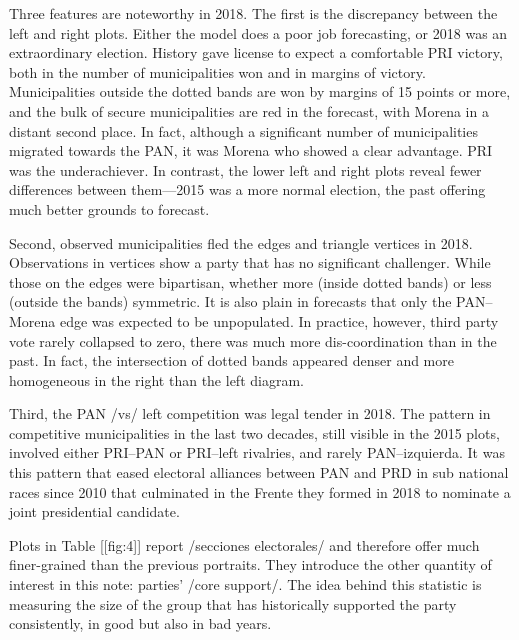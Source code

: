 \documentclass[letter,12pt]{article}
\begin{document}
Three features are noteworthy in 2018. The first is the discrepancy between the left and right plots. Either the model does a poor job forecasting, or 2018 was an extraordinary election. History gave license to expect a comfortable PRI victory, both in the number of municipalities won and in margins of victory. Municipalities outside the dotted bands are won by margins of 15 points or more, and the bulk of secure municipalities are red in the forecast, with Morena in a distant second place. In fact, although a significant number of municipalities migrated towards the PAN, it was Morena who showed a clear advantage. PRI was the underachiever. In contrast, the lower left and right plots reveal fewer differences between them---2015 was a more normal election, the past offering much better grounds to forecast. 

Second, observed municipalities fled the edges and triangle vertices in 2018. Observations in vertices show a party that has no significant challenger. While those on the edges were bipartisan, whether more (inside dotted bands) or less (outside the bands) symmetric. It is also plain in forecasts that only the PAN--Morena edge was expected to be unpopulated. In practice, however, third party vote rarely collapsed to zero, there was much more dis-coordination than in the past. In fact, the intersection of dotted bands appeared denser and more homogeneous in the right than the left diagram. 

Third, the PAN /vs/ left competition was legal tender in 2018. The pattern in competitive municipalities in the last two decades, still visible in the 2015 plots, involved either PRI--PAN or PRI--left rivalries, and rarely PAN--izquierda. It was this pattern that eased electoral alliances between PAN and PRD in sub national races since 2010 that culminated in the Frente they formed in 2018 to nominate a joint presidential candidate. 




Plots in Table [[fig:4]] report /secciones electorales/ and therefore offer much finer-grained than the previous portraits. They introduce the other quantity of interest in this note: parties' /core support/. The idea behind this statistic is measuring the size of the group that has historically supported the party consistently, in good but also in bad years. 
\end{document}
